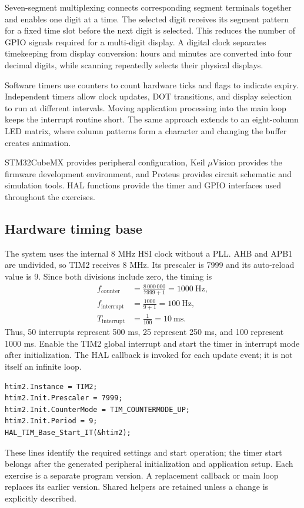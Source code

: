 \documentclass[a4paper]{article}
\newcommand{\topic}[1]{\subsection{#1}}
\begin{document}
Seven-segment multiplexing connects corresponding segment terminals together
and enables one digit at a time. The selected digit receives its segment pattern
for a fixed time slot before the next digit is selected. This reduces the number
of GPIO signals required for a multi-digit display. A digital clock separates
timekeeping from display conversion: hours and minutes are converted into four
decimal digits, while scanning repeatedly selects their physical displays.

Software timers use counters to count hardware ticks and flags to indicate
expiry. Independent timers allow clock updates, DOT transitions, and display
selection to run at different intervals. Moving application processing into the
main loop keeps the interrupt routine short. The same approach extends to an
eight-column LED matrix, where column patterns form a character and changing
the buffer creates animation.

STM32CubeMX provides peripheral configuration, Keil \mbox{$\mu$Vision} provides
the firmware development environment\cite{keil}, and Proteus provides circuit
schematic and simulation tools\cite{proteus}. HAL functions provide the timer
and GPIO interfaces used throughout the exercises\cite{hal}.

\topic{Hardware timing base}
The system uses the internal 8 MHz HSI clock without a PLL. AHB and APB1 are
undivided, so TIM2 receives 8 MHz. Its prescaler is 7999 and its auto-reload
value is 9. Since both divisions include zero, the timing is
\begin{align*}
f_{\mathrm{counter}}&=\frac{8\,000\,000}{7999+1}=1000\ \mathrm{Hz},\\
f_{\mathrm{interrupt}}&=\frac{1000}{9+1}=100\ \mathrm{Hz},\\
T_{\mathrm{interrupt}}&=\frac{1}{100}=10\ \mathrm{ms}.
\end{align*}
Thus, 50 interrupts represent 500 ms, 25 represent 250 ms, and 100 represent
1000 ms. Enable the TIM2 global interrupt and start the timer in interrupt
mode after initialization. The HAL callback is invoked for each update event;
it is not itself an infinite loop\cite{hal}.
\par\noindent\begin{minipage}{\linewidth}
\begin{lstlisting}[caption={Essential TIM2 settings and start operation}]
htim2.Instance = TIM2;
htim2.Init.Prescaler = 7999;
htim2.Init.CounterMode = TIM_COUNTERMODE_UP;
htim2.Init.Period = 9;
HAL_TIM_Base_Start_IT(&htim2);
\end{lstlisting}
\end{minipage}\par
These lines identify the required settings and start operation; the timer start
belongs after the generated peripheral initialization and application setup.
Each exercise is a separate program version. A replacement callback or main
loop replaces its earlier version. Shared helpers are retained unless a change
is explicitly described.
\end{document}
